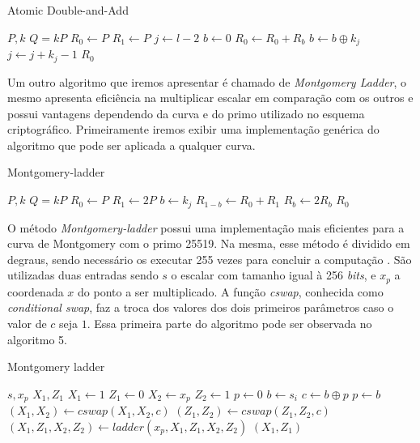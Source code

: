 \begin{algorithm}[H]
\caption{Atomic Double-and-Add}
\begin{algorithmic} 
    \REQUIRE $P, k$
    \ENSURE $Q = kP$
    \STATE $R_0 \leftarrow P$
    \STATE $R_1 \leftarrow P$
    \STATE $j \leftarrow l - 2$
    \STATE $b \leftarrow 0$
        \STATE $R_0 \leftarrow R_0 + R_b$
        \STATE $b \leftarrow b \oplus k_j$
        \STATE $j \leftarrow j + k_j -1$
    \ENDWHILE
    \RETURN $R_0$
    \end{algorithmic}
\end{algorithm}


Um outro algoritmo que iremos apresentar é chamado de \textit{Montgomery Ladder}, o mesmo apresenta eficiência na multiplicar escalar em comparação com os outros e possui vantagens dependendo da curva e do primo utilizado no esquema criptográfico. Primeiramente iremos exibir uma implementação genérica do algoritmo que pode ser aplicada a qualquer curva.

\begin{algorithm}[H]
\caption{Montgomery-ladder}
\begin{algorithmic} 
    \REQUIRE $P, k$
    \ENSURE $Q = kP$
    \STATE $R_0 \leftarrow P$
    \STATE $R_1 \leftarrow 2P$
        \STATE $b \leftarrow k_j$
        \STATE $R_{1-b} \leftarrow R_0 + R_1$
        \STATE $R_b \leftarrow 2R_b$
    \ENDFOR
    \RETURN $R_0$
    \end{algorithmic}
\end{algorithm}

O método \textit{Montgomery-ladder} possui uma implementação mais eficientes para a curva de Montgomery com o primo 25519. Na mesma, esse método é dividido em degraus, sendo necessário os executar 255 vezes para concluir a computação \cite{Dull:2015:HCM:2834659.2834708}. São utilizadas duas entradas sendo $s$ o escalar com tamanho igual à 256 \textit{bits}, e $x_p$ a coordenada $x$ do ponto a ser multiplicado. A função \textit{cswap}, conhecida como \textit{conditional swap}, faz a troca dos valores dos dois primeiros parâmetros caso o valor de $c$ seja $1$. Essa primeira parte do algoritmo pode ser observada no algoritmo 5.

\begin{algorithm}[H]
\caption{Montgomery ladder}
\begin{algorithmic} 
    \REQUIRE $s, x_p$
    \ENSURE $X_1, Z_1$
    \STATE $X_1 \leftarrow 1$
    \STATE $Z_1 \leftarrow 0$
    \STATE $X_2 \leftarrow x_p$
    \STATE $Z_2 \leftarrow 1$
    \STATE $p \leftarrow 0$
        \STATE $b \leftarrow s_i$
        \STATE $c \leftarrow b \oplus p$
        \STATE $p \leftarrow b$
        \STATE $(X_1, X_2) \leftarrow cswap(X_1,X_2,c)$
        \STATE $(Z_1,Z_2) \leftarrow cswap(Z_1,Z_2,c)$
        \STATE $(X_1, Z_1, X_2, Z_2) \leftarrow ladder(x_p, X_1, Z_1, X_2, Z_2)$
    \ENDFOR
    \RETURN $(X_1,Z_1)$
    \end{algorithmic}
\end{algorithm}

